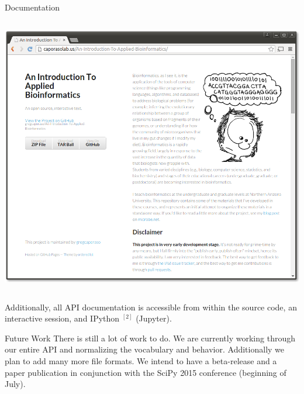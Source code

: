 \documentclass[final,t]{beamer}
\begin{document}
\begin{frame}{}
\begin{columns}[t]
\begin{column}{.3\linewidth}
\begin{block}{Documentation}
\begin{columns}
\begin{column}{.45\linewidth}
\begin{minipage}[c][15cm][c]{\linewidth}
                        \includegraphics[width=1\linewidth]{assets/iab}\\
                    \end{minipage}
                \end{column}
            \end{columns}
            Additionally, all API documentation is accessible from within the source code, an interactive session, and IPython $^{[2]}$ (Jupyter).

        \end{block}



        \begin{block}{Future Work}
            There is still a lot of work to do. We are currently working through our entire API and normalizing the vocabulary and behavior. Additionally we plan to add many more file formats.
            We intend to have a beta-release and a paper publication in conjunction with the SciPy 2015 conference (beginning of July).


\end{block}
\end{column}
\end{columns}
\end{frame}
\end{document}
